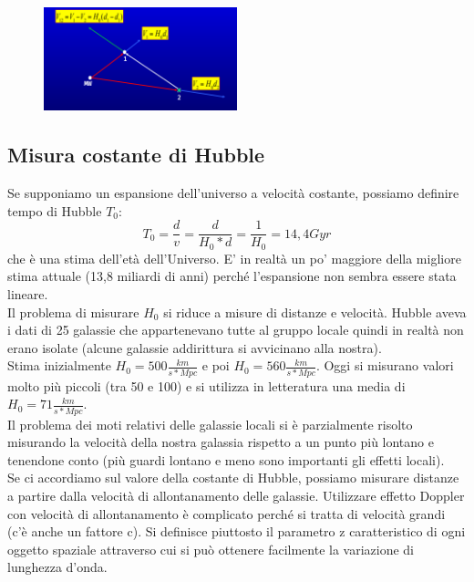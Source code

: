 \documentclass[a4paper,11pt]{article}
\begin{document}
\begin{figure}[h!!]
        \centering
        \includegraphics[width=0.5\textwidth]{immagini16dic/tuttilontani.png}
        \label{}
    \end{figure}
 \newline
\subsection{Misura costante di Hubble}
Se supponiamo un espansione dell'universo a velocità costante, possiamo definire tempo di Hubble $T_0$:
\begin{equation}
    T_0=\frac{d}{v}=\frac{d}{H_0*d}=\frac{1}{H_0}=14,4 Gyr
\end{equation}
che è una stima dell'età dell'Universo. E' in realtà un po' maggiore della migliore stima attuale (13,8 miliardi di anni) perché l'espansione non sembra essere stata lineare. \\
Il problema di misurare $H_0$ si riduce a misure di distanze e velocità. Hubble aveva i dati di 25 galassie che appartenevano tutte al gruppo locale quindi in realtà non erano isolate (alcune galassie addirittura si avvicinano alla nostra). \\
Stima inizialmente $H_0=500 \frac{km}{s*Mpc}$ e poi $H_0=560 \frac{km}{s*Mpc}$. Oggi si misurano valori molto più piccoli (tra 50 e 100) e si utilizza in letteratura una media di $H_0=71 \frac{km}{s*Mpc}$. \\
Il problema dei moti relativi delle galassie locali si è parzialmente risolto misurando la velocità della nostra galassia rispetto a un punto più lontano e tenendone conto (più guardi lontano e meno sono importanti gli effetti locali). \\
Se ci accordiamo sul valore della costante di Hubble, possiamo misurare distanze a partire dalla velocità di allontanamento delle galassie. Utilizzare effetto Doppler con velocità di allontanamento è complicato perché si tratta di velocità grandi (c'è anche un fattore c). Si definisce piuttosto il parametro z caratteristico di ogni oggetto spaziale attraverso cui si può ottenere facilmente la variazione di lunghezza d'onda. \\
\end{document}
